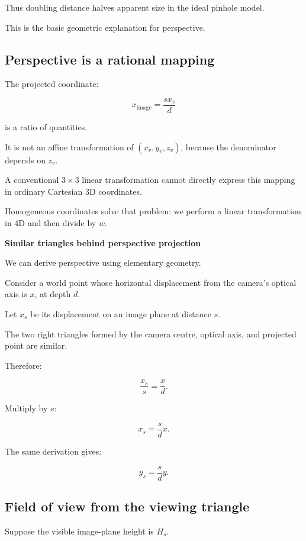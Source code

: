 Thus doubling distance halves apparent size in the ideal pinhole model.

This is the basic geometric explanation for perspective.

\subsection{Perspective is a rational mapping}\label{02-foundations-ii-ch033-perspective-is-a-rational-mapping}

The projected coordinate:

\[
 x_{\mathrm{image}}=\frac{s x_v}{d}
\]

is a ratio of quantities.

It is not an affine transformation of \((x_v,y_v,z_v)\), because the denominator depends on \(z_v\).

A conventional \(3\times3\) linear transformation cannot directly express this mapping in ordinary Cartesian 3D coordinates.

Homogeneous coordinates solve that problem: we perform a linear transformation in 4D and then divide by \(w\).

\textbf{Similar triangles behind perspective projection}

We can derive perspective using elementary geometry.

Consider a world point whose horizontal displacement from the camera's optical axis is \(x\), at depth \(d\).

Let \(x_s\) be its displacement on an image plane at distance \(s\).

The two right triangles formed by the camera centre, optical axis, and projected point are similar.

Therefore:

\[
 \frac{x_s}{s}=\frac{x}{d}.
\]

Multiply by \(s\):

\[
 \boxed{ x_s=\frac{s}{d}x }.
\]

The same derivation gives:

\[
 \boxed{ y_s=\frac{s}{d}y }.
\]

\subsection{Field of view from the viewing triangle}\label{02-foundations-ii-ch033-field-of-view-from-the-viewing-triangle}

Suppose the visible image-plane height is \(H_s\).

